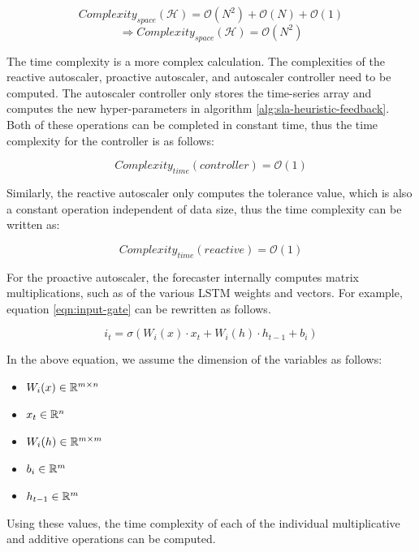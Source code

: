 \[Complexity_{space}(\mathcal{H}) = \mathcal{O}(N^2) + \mathcal{O}(N) + \mathcal{O}(1)\]
\begin{equation}
    \Rightarrow Complexity_{space}(\mathcal{H}) = \mathcal{O}(N^2)
\end{equation}

The time complexity is a more complex calculation. The complexities of the reactive autoscaler, proactive autoscaler, and autoscaler controller need to be computed. The autoscaler controller only stores the time-series array and computes the new hyper-parameters in algorithm \ref{alg:sla-heuristic-feedback}. Both of these operations can be completed in constant time, thus the time complexity for the controller is as follows:

\begin{equation}
    Complexity_{time}(controller) = \mathcal{O}(1)
\end{equation}

Similarly, the reactive autoscaler only computes the tolerance value, which is also a constant operation independent of data size, thus the time complexity can be written as:

\begin{equation}
    Complexity_{time}(reactive) = \mathcal{O}(1)
\end{equation}

For the proactive autoscaler, the forecaster internally computes matrix multiplications, such as of the various LSTM weights and vectors. For example, equation \ref{eqn:input-gate} can be rewritten as follows.

\begin{equation}
    i_{t} = \sigma(W_{i}(x) \cdot x_{t} + W_{i}(h) \cdot h_{t-1} + b_{i})
\end{equation}

In the above equation, we assume the dimension of the variables as follows:

\begin{itemize}
    \item $W_{i}(x) \in \mathbb{R}^{m \times n}$
    \item $x_{t} \in \mathbb{R}^{n}$
    \item $W_{i}(h) \in \mathbb{R}^{m \times m}$
    \item $b_{i} \in \mathbb{R}^{m}$
    \item $h_{t-1} \in \mathbb{R}^{m}$
\end{itemize}

Using these values, the time complexity of each of the individual multiplicative and additive operations can be computed.

